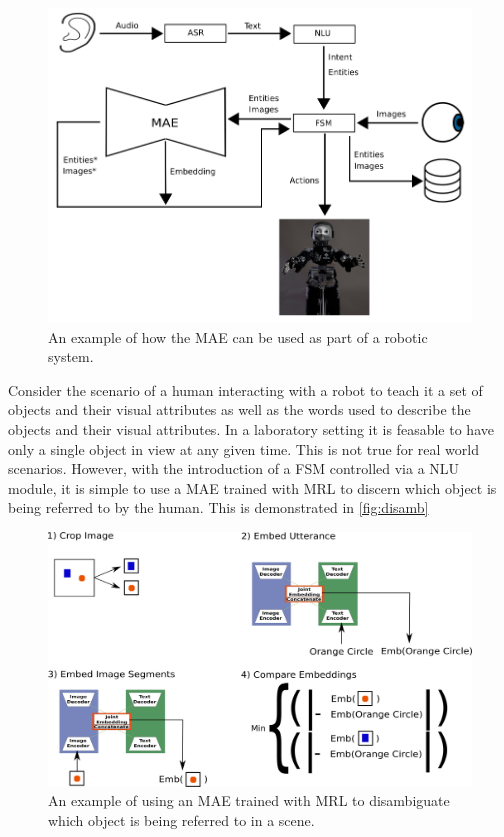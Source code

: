 \begin{figure}
\centering
\includegraphics[width=\textwidth]{Figs/futureWork/fsm.png}
\caption{An example of how the \ac{MAE} can be used as part of a robotic system.}
\label{fig:fsm}
\end{figure}

Consider the scenario of a human interacting with a robot to teach it a set of objects and their visual attributes as well as the words used to describe the objects and their visual attributes. In a laboratory setting it is feasable to have only a single object in view at any given time. This is not true for real world scenarios. However, with the introduction of a \ac{FSM} controlled via a \ac{NLU} module, it is simple to use a \ac{MAE} trained with \ac{MRL} to discern which object is being referred to by the human. This is demonstrated in \autoref{fig:disamb}

\begin{figure}
\centering
\includegraphics[width=\textwidth]{Figs/shapes/findingRefferant.png}
\caption{An example of using an MAE trained with MRL to disambiguate which object is being referred to in a scene.}
\label{fig:disamb}
\end{figure}

